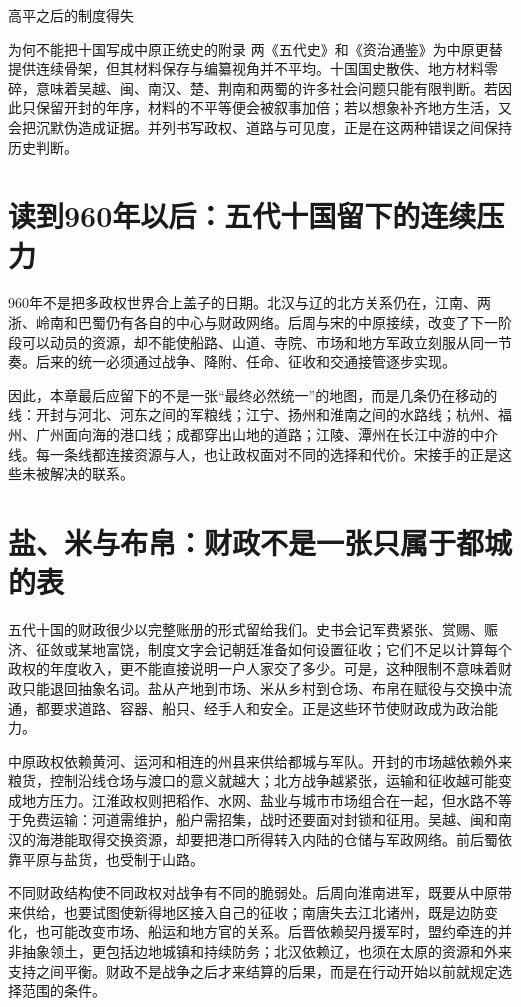 \begin{causalchain}{高平之后的制度得失}
\begin{debate}{为何不能把十国写成中原正统史的附录}
两《五代史》和《资治通鉴》为中原更替提供连续骨架，但其材料保存与编纂视角并不平均。十国国史散佚、地方材料零碎，意味着吴越、闽、南汉、楚、荆南和两蜀的许多社会问题只能有限判断。若因此只保留开封的年序，材料的不平等便会被叙事加倍；若以想象补齐地方生活，又会把沉默伪造成证据。并列书写政权、道路与可见度，正是在这两种错误之间保持历史判断。
\end{debate}

\section{读到960年以后：五代十国留下的连续压力}

960年不是把多政权世界合上盖子的日期。北汉与辽的北方关系仍在，江南、两浙、岭南和巴蜀仍有各自的中心与财政网络。后周与宋的中原接续，改变了下一阶段可以动员的资源，却不能使船路、山道、寺院、市场和地方军政立刻服从同一节奏。后来的统一必须通过战争、降附、任命、征收和交通接管逐步实现。

因此，本章最后应留下的不是一张“最终必然统一”的地图，而是几条仍在移动的线：开封与河北、河东之间的军粮线；江宁、扬州和淮南之间的水路线；杭州、福州、广州面向海的港口线；成都穿出山地的道路；江陵、潭州在长江中游的中介线。每一条线都连接资源与人，也让政权面对不同的选择和代价。宋接手的正是这些未被解决的联系。

\section{盐、米与布帛：财政不是一张只属于都城的表}

五代十国的财政很少以完整账册的形式留给我们。史书会记军费紧张、赏赐、赈济、征敛或某地富饶，制度文字会记朝廷准备如何设置征收；它们不足以计算每个政权的年度收入，更不能直接说明一户人家交了多少。可是，这种限制不意味着财政只能退回抽象名词。盐从产地到市场、米从乡村到仓场、布帛在赋役与交换中流通，都要求道路、容器、船只、经手人和安全。正是这些环节使财政成为政治能力。

中原政权依赖黄河、运河和相连的州县来供给都城与军队。开封的市场越依赖外来粮货，控制沿线仓场与渡口的意义就越大；北方战争越紧张，运输和征收越可能变成地方压力。江淮政权则把稻作、水网、盐业与城市市场组合在一起，但水路不等于免费运输：河道需维护，船户需招集，战时还要面对封锁和征用。吴越、闽和南汉的海港能取得交换资源，却要把港口所得转入内陆的仓储与军政网络。前后蜀依靠平原与盐货，也受制于山路。

不同财政结构使不同政权对战争有不同的脆弱处。后周向淮南进军，既要从中原带来供给，也要试图使新得地区接入自己的征收；南唐失去江北诸州，既是边防变化，也可能改变市场、船运和地方官的关系。后晋依赖契丹援军时，盟约牵连的并非抽象领土，更包括边地城镇和持续防务；北汉依赖辽，也须在太原的资源和外来支持之间平衡。财政不是战争之后才来结算的后果，而是在行动开始以前就规定选择范围的条件。


\end{causalchain}
